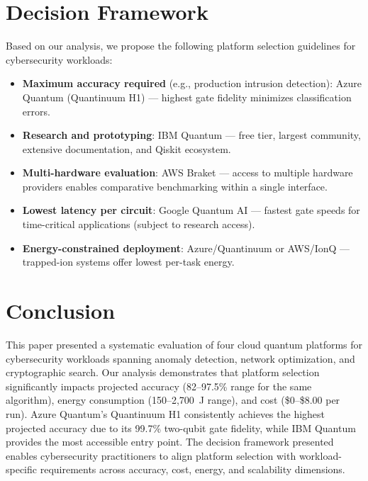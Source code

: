 \documentclass[conference]{IEEEtran}
\begin{document}
\section{Decision Framework}

Based on our analysis, we propose the following platform selection guidelines for cybersecurity workloads:

\begin{itemize}
    \item \textbf{Maximum accuracy required} (e.g., production intrusion detection): Azure Quantum (Quantinuum H1) --- highest gate fidelity minimizes classification errors.
    \item \textbf{Research and prototyping}: IBM Quantum --- free tier, largest community, extensive documentation, and Qiskit ecosystem.
    \item \textbf{Multi-hardware evaluation}: AWS Braket --- access to multiple hardware providers enables comparative benchmarking within a single interface.
    \item \textbf{Lowest latency per circuit}: Google Quantum AI --- fastest gate speeds for time-critical applications (subject to research access).
    \item \textbf{Energy-constrained deployment}: Azure/Quantinuum or AWS/IonQ --- trapped-ion systems offer lowest per-task energy.
\end{itemize}

\section{Conclusion}

This paper presented a systematic evaluation of four cloud quantum platforms for cybersecurity workloads spanning anomaly detection, network optimization, and cryptographic search. Our analysis demonstrates that platform selection significantly impacts projected accuracy (82--97.5\% range for the same algorithm), energy consumption (150--2,700~J range), and cost (\$0--\$8.00 per run). Azure Quantum's Quantinuum H1 consistently achieves the highest projected accuracy due to its 99.7\% two-qubit gate fidelity, while IBM Quantum provides the most accessible entry point. The decision framework presented enables cybersecurity practitioners to align platform selection with workload-specific requirements across accuracy, cost, energy, and scalability dimensions.
\end{document}

